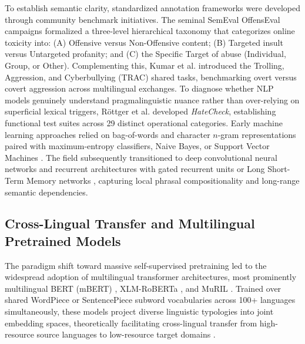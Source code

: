 \documentclass[11pt,a4paper]{article}
\begin{document}
To establish semantic clarity, standardized annotation frameworks were developed through community benchmark initiatives. The seminal SemEval OffensEval campaigns \cite{zampieri2019predicting,zampieri2020semeval} formalized a three-level hierarchical taxonomy that categorizes online toxicity into: (A) Offensive versus Non-Offensive content; (B) Targeted insult versus Untargeted profanity; and (C) the Specific Target of abuse (Individual, Group, or Other). Complementing this, Kumar et al. \cite{kumar2018benchmarking} introduced the Trolling, Aggression, and Cyberbullying (TRAC) shared tasks, benchmarking overt versus covert aggression across multilingual exchanges. To diagnose whether NLP models genuinely understand pragmalinguistic nuance rather than over-relying on superficial lexical triggers, R{\"o}ttger et al. \cite{rottger2021hatecheck} developed \textit{HateCheck}, establishing functional test suites across 29 distinct operational categories. Early machine learning approaches relied on bag-of-words and character $n$-gram representations paired with maximum-entropy classifiers, Naive Bayes, or Support Vector Machines \cite{waseem2016hateful}. The field subsequently transitioned to deep convolutional neural networks \cite{kim2014convolutional,badjatiya2017deep} and recurrent architectures with gated recurrent units or Long Short-Term Memory networks \cite{hochreiter1997long}, capturing local phrasal compositionality and long-range semantic dependencies.

\subsection{Cross-Lingual Transfer and Multilingual Pretrained Models}
The paradigm shift toward massive self-supervised pretraining led to the widespread adoption of multilingual transformer architectures, most prominently multilingual BERT (mBERT) \cite{devlin2019bert}, XLM-RoBERTa \cite{conneau2020unsupervised}, and MuRIL \cite{khanuja2021muril}. Trained over shared WordPiece or SentencePiece subword vocabularies across 100+ languages simultaneously, these models project diverse linguistic typologies into joint embedding spaces, theoretically facilitating cross-lingual transfer from high-resource source languages to low-resource target domains \cite{ranasinghe2020multilingual}.
\end{document}
